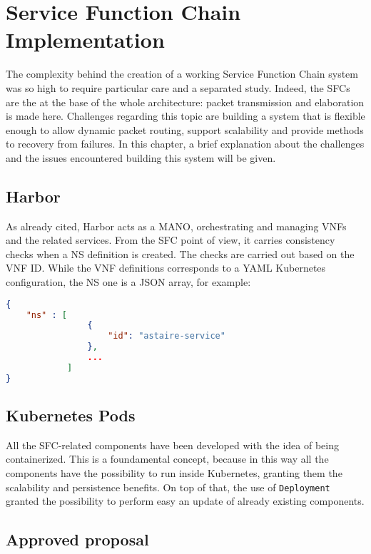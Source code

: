 \chapter{Service Function Chain Implementation} 
\label{chap:vnf_ns_impl}

The complexity behind the creation of a working Service Function Chain system
was so high to require particular care and a separated study. Indeed, the SFCs
are the at the base of the whole architecture: packet transmission and
elaboration is made here. Challenges regarding this topic are building a system
that is flexible enough to allow dynamic packet routing, support scalability and
provide methods to recovery from failures. In this chapter, a brief explanation
about the challenges and the issues encountered building this system will be
given.

\section{Harbor}

As already cited, Harbor acts as a MANO, orchestrating and managing VNFs and the
related services. From the SFC point of view, it carries consistency checks when
a NS definition is created. The checks are carried out based on the VNF ID.
While the VNF definitions corresponds to a YAML Kubernetes configuration, the NS
one is a JSON array, for example:

\begin{lstlisting}[caption={Example of SFC definition}, captionpos=b,
                   language=json, label=chap:impl:lst:sfcexample]
{
    "ns" : [
                {
                    "id": "astaire-service"
                },
                ...
            ]
}
\end{lstlisting}



\section{Kubernetes Pods}

All the SFC-related components have been developed with the idea of being
containerized. This is a foundamental concept, because in this way all the
components have the possibility to run inside Kubernetes, granting them the
scalability and persistence benefits. On top of that, the use of
\verb!Deployment! granted the possibility to perform easy an update of already
existing components.

\section{Approved proposal}

